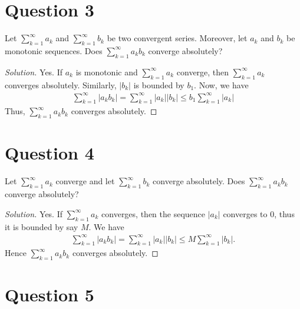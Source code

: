 \documentclass[a4paper]{article}
\theoremstyle{definition}
\begin{document}
\section{Question 3}
Let \(\sum_{k=1}^\infty a_k\) and \(\sum_{k=1}^\infty b_k\) be two convergent series. Moreover, let \(a_k\) and \(b_k\) be monotonic sequences. Does \(\sum_{k=1}^{\infty}a_k b_k\) converge absolutely?
\begin{proof}[Solution]
    Yes. If \(a_k\) is monotonic and \(\sum_{k=1}^{\infty} a_k\) converge, then \(\sum_{k=1}^\infty a_k\) converges absolutely. Similarly, \(|b_k|\) is bounded by \(b_1\). Now, we have
    \begin{align*}
        \sum_{k=1}^{\infty} |a_k b_k | = \sum_{k=1}^{\infty} |a_k || b_k | \leq b_1 \sum_{k=1}^{\infty} |a_k |
    \end{align*}
    Thus, \(\sum_{k=1}^\infty a_k b_k\) converges absolutely.
\end{proof}
\section{Question 4}
Let \(\sum_{k=1}^\infty a_k\) converge and let \(\sum_{k=1}^\infty b_k\) converge absolutely. Does \(\sum_{k=1}^\infty a_k b_k\) converge absolutely?
\begin{proof}[Solution]
    Yes. If \(\sum_{k=1}^\infty a_k\) converges, then the sequence \(|a_k|\) converges to \(0\), thus it is bounded by say \(M\). We have
    \begin{align*}
        \sum_{k=1}^{\infty} |a_k b_k| = \sum_{k=1}^{\infty} |a_k | | b_k| \leq M \sum_{k=1}^{\infty} |b_k| \text{.}
    \end{align*}
    Hence \(\sum_{k=1}^{\infty} a_k b_k\) converges absolutely.
\end{proof}

\section{Question 5}
\end{document}
